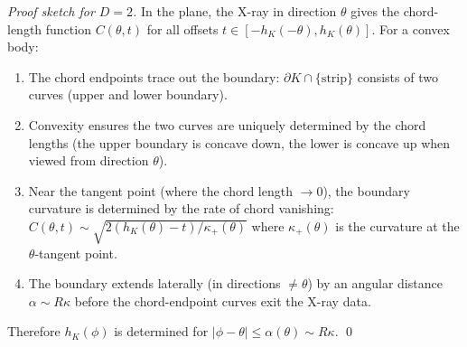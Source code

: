 \begin{proof}[Proof sketch for $D = 2$]
In the plane, the X-ray in direction $\theta$ gives the chord-length function $C(\theta, t)$ for all offsets $t \in [-h_K(-\theta), h_K(\theta)]$. For a convex body:
\begin{enumerate}
  \item The chord endpoints trace out the boundary: $\partial K \cap \{\text{strip}\}$ consists of two curves (upper and lower boundary).
  \item Convexity ensures the two curves are uniquely determined by the chord lengths (the upper boundary is concave down, the lower is concave up when viewed from direction $\theta$).
  \item Near the tangent point (where the chord length $\to 0$), the boundary curvature is determined by the rate of chord vanishing: $C(\theta, t) \sim \sqrt{2(h_K(\theta) - t) / \kappa_+(\theta)}$ where $\kappa_+(\theta)$ is the curvature at the $\theta$-tangent point.
  \item The boundary extends laterally (in directions $\neq \theta$) by an angular distance $\alpha \sim R\kappa$ before the chord-endpoint curves exit the X-ray data.
\end{enumerate}
Therefore $h_K(\phi)$ is determined for $|\phi - \theta| \leq \alpha(\theta) \sim R\kappa$. \qed
\end{proof}


